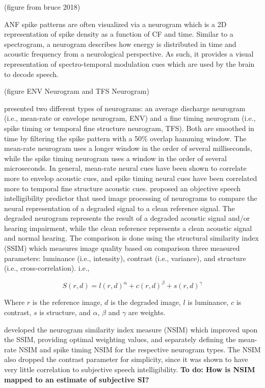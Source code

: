 (figure from bruce 2018)

ANF spike patterns are often visualized via a neurogram which is a 2D representation of spike density as a function of CF and time. Similar to a spectrogram, a neurogram describes how energy is distributed in time and acoustic frequency from a neurological perspective. As such, it provides a visual representation of spectro-temporal modulation cues which are used by the brain to decode speech.

(figure ENV Neurogram and TFS Neurogram)

\cite{hines2010speech} presented two different types of neurograms: an average discharge neurogram (i.e., mean-rate or envelope neurogram, ENV) and a fine timing neurogram (i.e., spike timing or temporal fine structure neurogram, TFS). Both are smoothed in time by filtering the spike pattern with a 50\% overlap hamming window. The mean-rate neurogram uses a longer window in the order of several milliseconds, while the spike timing neurogram uses a window in the order of several microseconds. In general, mean-rate neural cues have been shown to correlate more to envelop acoustic cues, and spike timing neural cues have been correlated more to temporal fine structure acoustic cues. \cite{hines2010speech} proposed an objective speech intelligibility predictor that used image processing of neurograms to compare the neural representation of a degraded signal to a clean reference signal. The degraded neurogram represents the result of a degraded acoustic signal and/or hearing impairment, while the clean reference represents a clean acoustic signal and normal hearing. The comparison is done using the structural similarity index (SSIM) which measures image quality based on comparison three measured parameters: luminance (i.e., intensity), contrast (i.e., variance), and structure (i.e., cross-correlation). i.e.,

\[S(r,d)=l(r,d)^\alpha+c(r,d)^\beta+s(r,d)^\gamma\]

Where $r$ is the reference image, $d$ is the degraded image, $l$ is luminance, $c$ is contrast, $s$ is structure, and $\alpha$, $\beta$ and $\gamma$ are weights.

\cite{hines2012speech} developed the neurogram similarity index measure (NSIM) which improved upon the SSIM, providing optimal weighting values, and separately defining the mean-rate NSIM and spike timing NSIM for the respective neurogram types. The NSIM also dropped the contrast parameter for simplicity, since it was shown to have very little correlation to subjective speech intelligibility. \textbf{To do: How is NSIM mapped to an estimate of subjective SI?}

